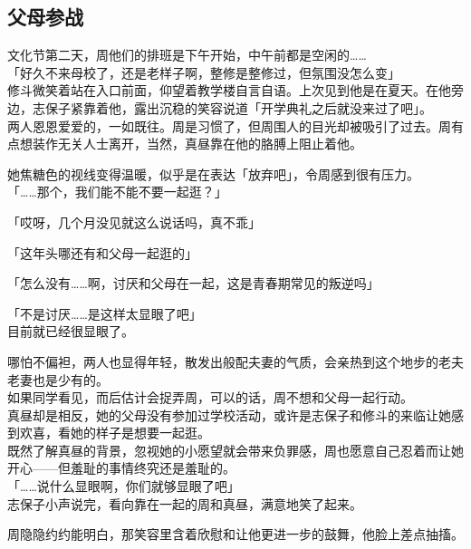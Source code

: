 \subsection{父母参战}

文化节第二天，周他们的排班是下午开始，中午前都是空闲的……\\

「好久不来母校了，还是老样子啊，整修是整修过，但氛围没怎么变」\\

修斗微笑着站在入口前面，仰望着教学楼自言自语。上次见到他是在夏天。在他旁边，志保子紧靠着他，露出沉稳的笑容说道「开学典礼之后就没来过了吧」。\\

两人恩恩爱爱的，一如既往。周是习惯了，但周围人的目光却被吸引了过去。周有点想装作无关人士离开，当然，真昼靠在他的胳膊上阻止着他。

她焦糖色的视线变得温暖，似乎是在表达「放弃吧」，令周感到很有压力。\\

「……那个，我们能不能不要一起逛？」

「哎呀，几个月没见就这么说话吗，真不乖」

「这年头哪还有和父母一起逛的」

「怎么没有……啊，讨厌和父母在一起，这是青春期常见的叛逆吗」

「不是讨厌……是这样太显眼了吧」\\

目前就已经很显眼了。

哪怕不偏袒，两人也显得年轻，散发出般配夫妻的气质，会亲热到这个地步的老夫老妻也是少有的。\\

如果同学看见，而后估计会捉弄周，可以的话，周不想和父母一起行动。\\

真昼却是相反，她的父母没有参加过学校活动，或许是志保子和修斗的来临让她感到欢喜，看她的样子是想要一起逛。\\

既然了解真昼的背景，忽视她的小愿望就会带来负罪感，周也愿意自己忍着而让她开心——但羞耻的事情终究还是羞耻的。\\

「……说什么显眼啊，你们就够显眼了吧」\\

志保子小声说完，看向靠在一起的周和真昼，满意地笑了起来。

周隐隐约约能明白，那笑容里含着欣慰和让他更进一步的鼓舞，他脸上差点抽搐。\\

